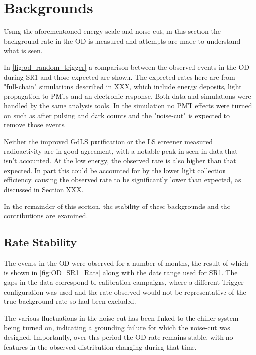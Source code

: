 \section{Backgrounds}
\label{sec:od_analysis_backgrounds}

\par
Using the aforementioned energy scale and noise cut, in this section the background rate in the OD is measured and attempts are made to understand what is seen.
\par
In \autoref{fig:od_random_trigger} a comparison between the observed events in the OD during SR1 and those expected are shown.
The expected rates here are from "full-chain" simulations described in XXX, which include energy deposits, light propagation to PMTs and an electronic response.
Both data and simulations were handled by the same analysis tools.
In the simulation no PMT effects were turned on such as after pulsing and dark counts and the "noise-cut" is expected to remove those events.
\par
Neither the improved GdLS purification or the LS screener measured radioactivity are in good agreement, with a notable peak in seen in data that isn't accounted.
At the low energy, the observed rate is also higher than that expected.
In part this could be accounted for by the lower light collection efficiency, causing the observed rate to be significantly lower than expected, as discussed in Section XXX.



\par
In the remainder of this section, the stability of these backgrounds and the contributions are examined.

\subsection{Rate Stability}

\par
The events in the OD were observed for a number of months, the result of which is shown in \autoref{fig:OD_SR1_Rate} along with the date range used for SR1.
The gaps in the data correspond to calibration campaigns, where a different Trigger configuration was used and the rate observed would not be representative of the true background rate so had been excluded.
\par
The various fluctuations in the noise-cut has been linked to the chiller system being turned on, indicating a grounding failure for which the noise-cut was designed.
Importantly, over this period the OD rate remains stable, with no features in the observed distribution changing during that time.

